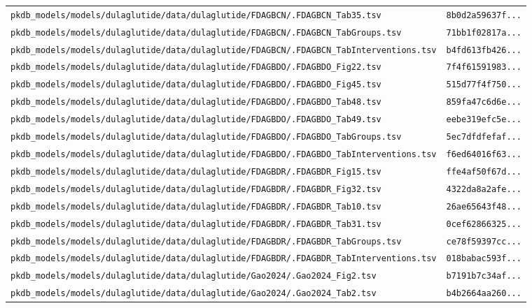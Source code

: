 \documentclass{article}
\begin{document}
\begin{longtable}{ll}
\texttt{pkdb\_models/models/dulaglutide/data/dulaglutide/FDAGBCN/.FDAGBCN\_Tab35.tsv} & \texttt{8b0d2a59637f...} \\
\texttt{pkdb\_models/models/dulaglutide/data/dulaglutide/FDAGBCN/.FDAGBCN\_TabGroups.tsv} & \texttt{71bb1f02817a...} \\
\texttt{pkdb\_models/models/dulaglutide/data/dulaglutide/FDAGBCN/.FDAGBCN\_TabInterventions.tsv} & \texttt{b4fd613fb426...} \\
\texttt{pkdb\_models/models/dulaglutide/data/dulaglutide/FDAGBDO/.FDAGBDO\_Fig22.tsv} & \texttt{7f4f61591983...} \\
\texttt{pkdb\_models/models/dulaglutide/data/dulaglutide/FDAGBDO/.FDAGBDO\_Fig45.tsv} & \texttt{515d77f4f750...} \\
\texttt{pkdb\_models/models/dulaglutide/data/dulaglutide/FDAGBDO/.FDAGBDO\_Tab48.tsv} & \texttt{859fa47c6d6e...} \\
\texttt{pkdb\_models/models/dulaglutide/data/dulaglutide/FDAGBDO/.FDAGBDO\_Tab49.tsv} & \texttt{eebe319efc5e...} \\
\texttt{pkdb\_models/models/dulaglutide/data/dulaglutide/FDAGBDO/.FDAGBDO\_TabGroups.tsv} & \texttt{5ec7dfdfefaf...} \\
\texttt{pkdb\_models/models/dulaglutide/data/dulaglutide/FDAGBDO/.FDAGBDO\_TabInterventions.tsv} & \texttt{f6ed64016f63...} \\
\texttt{pkdb\_models/models/dulaglutide/data/dulaglutide/FDAGBDR/.FDAGBDR\_Fig15.tsv} & \texttt{ffe4af50f67d...} \\
\texttt{pkdb\_models/models/dulaglutide/data/dulaglutide/FDAGBDR/.FDAGBDR\_Fig32.tsv} & \texttt{4322da8a2afe...} \\
\texttt{pkdb\_models/models/dulaglutide/data/dulaglutide/FDAGBDR/.FDAGBDR\_Tab10.tsv} & \texttt{26ae65643f48...} \\
\texttt{pkdb\_models/models/dulaglutide/data/dulaglutide/FDAGBDR/.FDAGBDR\_Tab31.tsv} & \texttt{0cef62866325...} \\
\texttt{pkdb\_models/models/dulaglutide/data/dulaglutide/FDAGBDR/.FDAGBDR\_TabGroups.tsv} & \texttt{ce78f59397cc...} \\
\texttt{pkdb\_models/models/dulaglutide/data/dulaglutide/FDAGBDR/.FDAGBDR\_TabInterventions.tsv} & \texttt{018babac593f...} \\
\texttt{pkdb\_models/models/dulaglutide/data/dulaglutide/Gao2024/.Gao2024\_Fig2.tsv} & \texttt{b7191b7c34af...} \\
\texttt{pkdb\_models/models/dulaglutide/data/dulaglutide/Gao2024/.Gao2024\_Tab2.tsv} & \texttt{b4b2664aa260...} \\

\end{longtable}
\end{document}
